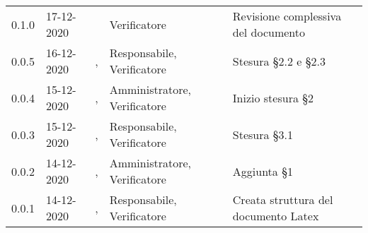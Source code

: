 {{\begin{longtable}{C{1.7cm} C{2.5cm} C{3.2cm} C{2.7cm} C{4.8cm}}
0.1.0 & 17-12-2020 & \ZM{} & Verificatore & Revisione complessiva del documento \\

0.0.5 & 16-12-2020 & \BM{}, \SH{} & Responsabile, Verificatore & Stesura \S 2.2 e \S 2.3 \\
		
0.0.4 & 15-12-2020 & \PA{}, \SH{} & Amministratore, Verificatore & Inizio stesura \S 2 \\

0.0.3 & 15-12-2020 & \SG{}, \ZM{} & Responsabile, Verificatore & Stesura \S 3.1 \\

0.0.2 & 14-12-2020 & \PA{}, \ZM{} & Amministratore, Verificatore & Aggiunta \S 1 \\

0.0.1 & 14-12-2020 & \SG{}, \ZM{} & Responsabile, Verificatore & Creata struttura del documento Latex \\
		
\end{longtable}
}
}
